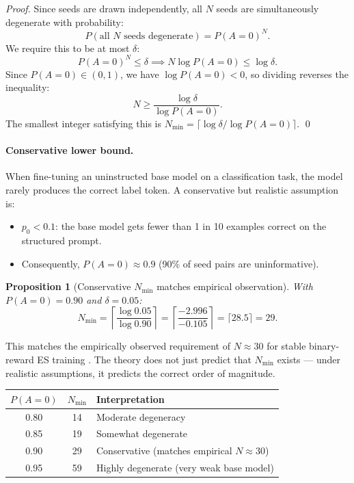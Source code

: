 \documentclass[11pt]{article}
\newtheorem{proposition}{Proposition}
\theoremstyle{definition}
\theoremstyle{remark}
\newcommand{\Nmin}{N_{\mathrm{min}}}
\begin{document}
\begin{proof}
Since seeds are drawn independently, all $N$ seeds are simultaneously degenerate with probability:
\[
  P(\text{all } N \text{ seeds degenerate}) = P(A=0)^N.
\]
We require this to be at most $\delta$:
\[
  P(A=0)^N \leq \delta \implies N \log P(A=0) \leq \log \delta.
\]
Since $P(A=0) \in (0,1)$, we have $\log P(A=0) < 0$, so dividing reverses the inequality:
\[
  N \geq \frac{\log \delta}{\log P(A=0)}.
\]
The smallest integer satisfying this is $\Nmin = \lceil \log\delta / \log P(A=0) \rceil$. \qed
\end{proof}

\paragraph{Conservative lower bound.}
When fine-tuning an uninstructed base model on a classification task, the model rarely produces the correct label token. A conservative but realistic assumption is:
\begin{itemize}[leftmargin=*]
  \item $p_0 < 0.1$: the base model gets fewer than 1 in 10 examples correct on the structured prompt.
  \item Consequently, $P(A=0) \approx 0.9$ (90\% of seed pairs are uninformative).
\end{itemize}

\begin{proposition}[Conservative $\Nmin$ matches empirical observation]
\label{prop:nmin-conservative}
With $P(A=0) = 0.90$ and $\delta = 0.05$:
\begin{equation}
  \Nmin = \left\lceil \frac{\log 0.05}{\log 0.90} \right\rceil = \left\lceil \frac{-2.996}{-0.105} \right\rceil = \lceil 28.5 \rceil = \boxed{29}.
  \label{eq:nmin-29}
\end{equation}
\end{proposition}

This matches the empirically observed requirement of $N \approx 30$ for stable binary-reward ES training \citep{qiu2025esscale,liang2026blessing}. The theory does not just predict that $\Nmin$ exists --- under realistic assumptions, it predicts the correct order of magnitude.

\begin{center}
\begin{tabular}{ccl}
\toprule
$P(A=0)$ & $\Nmin$ & Interpretation\\
\midrule
0.80 & 14 & Moderate degeneracy\\
0.85 & 19 & Somewhat degenerate\\
0.90 & 29 & Conservative (matches empirical $N \approx 30$)\\
0.95 & 59 & Highly degenerate (very weak base model)\\
\bottomrule
\end{tabular}
\end{center}
\end{document}
